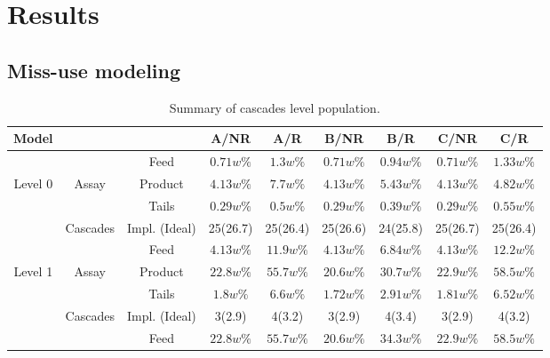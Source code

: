 \section{Results}

\subsection{Miss-use modeling}

\begin{table}[h!]
\centering
  \caption{Summary of cascades level population.}
\begin{tabular*}{\textwidth}{c @{\extracolsep{\fill}} cccccccc}
\toprule

Model       &        &            & A/NR      & A/R       & B/NR      & B/R      & C/NR       & C/R       \\
\midrule                                                                                                 
        &            & Feed       & $0.71w\%$ & $1.3w\%$  & $0.71w\%$ & $0.94w\%$ & $0.71w\%$ & $1.33w\%$ \\
Level 0 & Assay      & Product    & $4.13w\%$ & $7.7w\%$  & $4.13w\%$ & $5.43w\%$ & $4.13w\%$ & $4.82w\%$ \\
        &            & Tails      & $0.29w\%$ & $0.5w\%$  & $0.29w\%$ & $0.39w\%$ & $0.29w\%$ & $0.55w\%$ \\
        & Cascades   & Impl. (Ideal)& 25(26.7)  & 25(26.4)  & 25(26.6)  & 24(25.8)  & 25(26.7)  & 25(26.4)  \\
\midrule                                                                                                 
        &            & Feed       & $4.13w\%$ & $11.9w\%$ & $4.13w\%$ & $6.84w\%$ & $4.13w\%$ & $12.2w\%$ \\
Level 1 & Assay      & Product    & $22.8w\%$ & $55.7w\%$ & $20.6w\%$ & $30.7w\%$ & $22.9w\%$ & $58.5w\%$ \\
        &            & Tails      & $1.8w\%$  & $6.6w\%$  & $1.72w\%$ & $2.91w\%$ & $1.81w\%$ & $6.52w\%$ \\
        & Cascades   & Impl. (Ideal)& 3(2.9)    & 4(3.2)    & 3(2.9)    & 4(3.4)    & 3(2.9)    & 4(3.2)    \\
\midrule                                                                                                 
        &            & Feed       & $22.8w\%$ & $55.7w\%$ & $20.6w\%$ & $34.3w\%$ & $22.9w\%$ & $58.5w\%$ \\

\end{tabular*}
\end{table}
